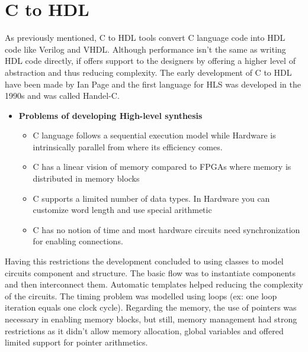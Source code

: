 \documentclass{cup-pan}
\begin{document}
\section{C to HDL}
\label{sec:overview}
As previously mentioned, C to HDL tools convert C language code into HDL code like Verilog and VHDL. Although performance isn’t the same as writing HDL code directly, if offers support to the designers by offering a higher level of abstraction and thus reducing complexity. The early development of C to HDL have been made by Ian Page and the first language for HLS was developed in the 1990s and was called Handel-C.

\begin{itemize}
    \item  \textbf{Problems of developing High-level synthesis}
    \begin{itemize}
        \item  C language follows a sequential execution model while Hardware is intrinsically parallel from where its efficiency comes.
        \item  C has a linear vision of memory compared to FPGAs where memory is distributed in memory blocks
        \item  C supports a limited number of data types. In Hardware you can customize word length and use special arithmetic
        \item  C has no notion of time and most hardware circuits need synchronization for enabling connections.
    \end{itemize}
\end{itemize}

Having this restrictions the development concluded to using classes to model circuits component and structure. The basic flow was to instantiate components and then interconnect them. Automatic templates helped reducing the complexity of the circuits. The timing problem was modelled using loops (ex: one loop iteration equals one clock cycle). Regarding the memory, the use of pointers was necessary in enabling memory blocks, but still, memory management had strong restrictions as it didn’t allow memory allocation, global variables and offered limited support for pointer arithmetics.
\end{document}
